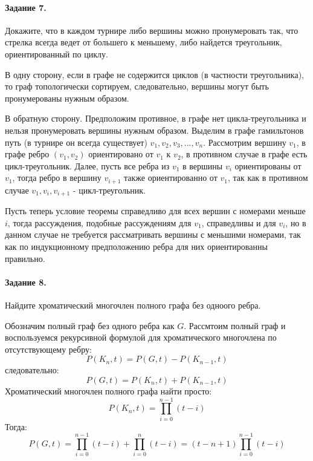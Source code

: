 \documentclass[a4paper,12pt]{article}
\begin{document}
\paragraph{Задание 7.} Докажите, что в каждом турнире либо вершины можно пронумеровать так, что стрелка всегда ведет от большего к меньшему, либо найдется треугольник, ориентированный по циклу.

\begin{Solution}
В одну сторону, если в графе не содержится циклов (в частности треугольника), то граф топологически сортируем, следовательно, вершины могут быть пронумерованы нужным образом.

В обратную сторону. Предположим противное, в графе нет цикла-треугольника и нельзя пронумеровать вершины нужным образом. Выделим в графе гамильтонов путь (в турнире он всегда существует) $v_1, v_2, v_3, ..., v_n$. Рассмотрим вершину $v_1$, в графе ребро $(v_1,v_2)$ ориентировано от $v_1$ к $v_2$, в противном случае в графе есть цикл-треугольник. Далее, пусть все ребра из $v_1$ в вершины $v_i$ ориентированы от $v_1$, тогда ребро в вершину $v_{i+1}$ также ориентированно от $v_1$, так как в противном случае $v_1, v_i, v_{i+1}$ - цикл-треугольник.

Пусть теперь условие теоремы справедливо для всех вершин с номерами меньше $i$, тогда рассуждения, подобные рассуждениям для $v_1$, справедливы и для $v_i$, но в данном случае не требуется рассматривать вершины с меньшими номерами, так как по индукционному предположению ребра для них ориентированны правильно.
\end{Solution}

\paragraph{Задание 8.} Найдите хроматический многочлен полного графа без одноого ребра.

\begin{Solution}
Обозначим полный граф без одного ребра как $G$. Рассмтоим полный граф и воспользуемся рекурсивной формулой для хроматического многочлена по отсутствующему ребру:
\[
	P\left(K_n,t\right) = P\left(G, t\right) - P\left(K_{n-1},t\right)
\]
следовательно:
\[
	P\left(G, t\right) = P\left(K_n,t\right) + P\left(K_{n-1},t\right)
\]
Хроматический многочлен полного графа найти просто:
\[
	P\left(K_n,t\right) = \prod_{i=0}^{n-1} \left(t-i\right)
\]
Тогда:
\[
	P\left(G, t\right) = \prod_{i=0}^{n-1} \left(t-i\right) + \prod_{i=0}^n \left(t-i\right) = \left(t-n+1\right) \prod_{i=0}^{n-1} \left(t-i\right)
\]
\end{Solution}
\end{document}

